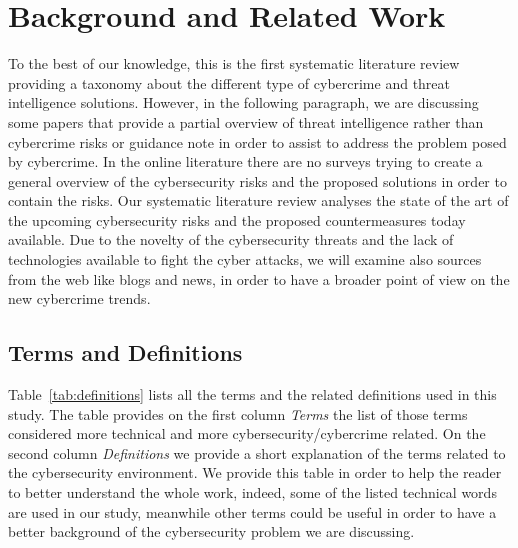 \section{Background and Related Work}\label{rel}
To the best of our knowledge, this is the first systematic literature review providing a taxonomy about the different type of cybercrime and threat intelligence solutions. However, in the following paragraph, we are discussing some papers that provide a partial overview of threat intelligence rather than cybercrime risks or guidance note in order to assist to address the problem posed by cybercrime. In the online literature there are no surveys trying to create a general overview of the cybersecurity risks and the proposed solutions in order to contain the risks. Our systematic literature review analyses the state of the art of the upcoming cybersecurity risks and the proposed countermeasures today available.
Due to the novelty of the cybersecurity threats and the lack of technologies available to fight the cyber attacks, we will examine also sources from the web like blogs and news, in order to have a broader point of view on the new cybercrime trends.


\subsection{Terms and Definitions}


Table~\ref{tab:definitions} lists all the terms and the related definitions used in this study. The table provides on the first column \textit{Terms} the list of those terms considered more technical and more cybersecurity/cybercrime related. On the second column \textit{Definitions} we provide a short explanation of the terms related to the cybersecurity environment. We provide this table in order to help the reader to better understand the whole work, indeed, some of the listed technical words are used in our study, meanwhile other terms could be useful in order to have a better background of the cybersecurity problem we are discussing.


